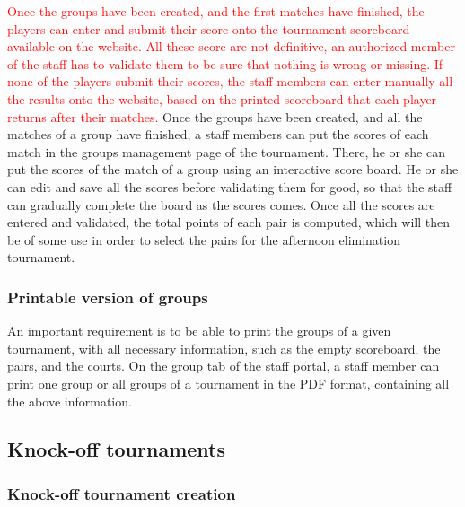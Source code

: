 \textcolor{red}{Once the groups have been created, and the first matches have finished, 
the players can enter and submit their score onto the tournament scoreboard
available on the website. All these score are not definitive, an authorized member of the staff has to
validate them to be sure that nothing is  wrong or missing. If none of the
players submit their scores, the staff members can enter manually all the
results onto the website, based on the printed scoreboard that each player
returns after their matches.}
Once the groups have been created, and all the matches of a group have
finished, a staff members can put the scores of each match in the groups
management page of the tournament. There, he or she can put the scores of the
match of a group using an interactive score board. He or she can edit and save
all the scores before validating them for good, so that the staff can gradually
complete the board as the scores comes. Once all the scores are entered and
validated, the total points of each pair is computed, which will then be of
some use in order to select the pairs for the afternoon elimination tournament.
\newline

\subsubsection{Printable version of groups}
\label{subs:Printable version of groups}


An important requirement is to be able to print the groups of a given
tournament, with all necessary information, such as the empty scoreboard, the
pairs, and the courts. On the group tab of the staff portal, a staff member can
print one group or all groups of a tournament in the PDF format, containing
all the above information.

\subsection{Knock-off tournaments}
\label{sub:Knock-off tournaments}

\subsubsection{Knock-off tournament creation}
\label{subs:Knock-off tournament creation}


